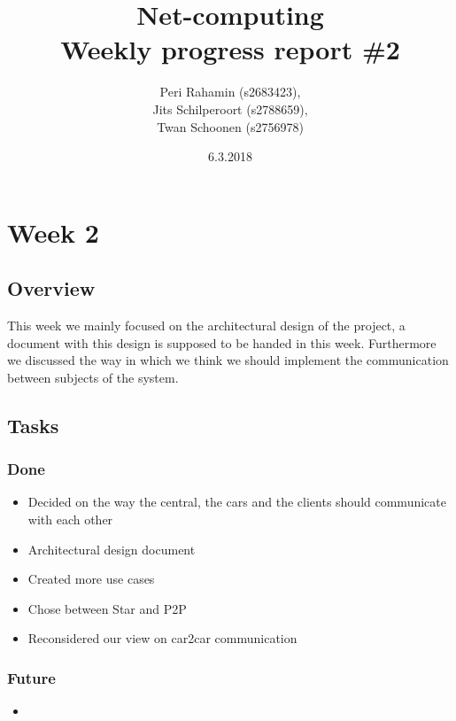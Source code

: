 \documentclass[a4paper]{article}
\begin{document}
\title{Net-computing\\
Weekly progress report \#2
}

\date{6.3.2018}

\author{Peri Rahamin (s2683423),\\
Jits Schilperoort (s2788659),\\
Twan Schoonen (s2756978)
}


\maketitle
\section*{Week 2}
\subsection*{Overview}
This week we mainly focused on the architectural design of the project, a document with this design is supposed to be handed in this week. Furthermore we discussed the way in which we think we should implement the communication between subjects of the system. 

\subsection*{Tasks}
\subsubsection*{Done}
\begin{itemize}
    \item Decided on the way the central, the cars and the clients should communicate with each other
    \item Architectural design document
    \item Created more use cases
    \item Chose between Star and P2P
    \item Reconsidered our view on car2car communication
\end{itemize}

\subsubsection*{Future}
\begin{itemize}
    \item 
\end{itemize}
\end{document}
